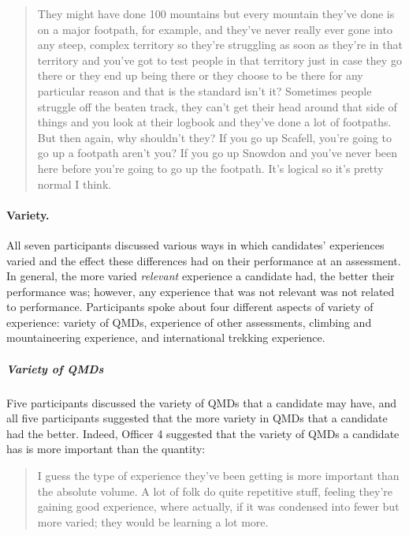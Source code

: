 \documentclass[
  12pt,
  a4paper,
]{book}
\begin{document}
\begin{quote}
They might have done 100 mountains but every mountain they've done is on a major footpath, for example, and they've never really ever gone into any steep, complex territory so they're struggling as soon as they're in that territory and you've got to test people in that territory just in case they go there or they end up being there or they choose to be there for any particular reason and that is the standard isn't it? Sometimes people struggle off the beaten track, they can't get their head around that side of things and you look at their logbook and they've done a lot of footpaths. But then again, why shouldn't they? If you go up Scafell, you're going to go up a footpath aren't you? If you go up Snowdon and you've never been here before you're going to go up the footpath. It's logical so it's pretty normal I think.
\end{quote}

\hypertarget{variety.}{%
\paragraph{Variety.}\label{variety.}}

All seven participants discussed various ways in which candidates' experiences varied and the effect these differences had on their performance at an assessment. In general, the more varied \emph{relevant} experience a candidate had, the better their performance was; however, any experience that was not relevant was not related to performance. Participants spoke about four different aspects of variety of experience: variety of QMDs, experience of other assessments, climbing and mountaineering experience, and international trekking experience.

\hypertarget{variety-of-qmds}{%
\subparagraph{Variety of QMDs}\label{variety-of-qmds}}

Five participants discussed the variety of QMDs that a candidate may have, and all five participants suggested that the more variety in QMDs that a candidate had the better. Indeed, Officer 4 suggested that the variety of QMDs a candidate has is more important than the quantity:

\begin{quote}
I guess the type of experience they've been getting is more important than the absolute volume. A lot of folk do quite repetitive stuff, feeling they're gaining good experience, where actually, if it was condensed into fewer but more varied; they would be learning a lot more.
\end{quote}
\end{document}
